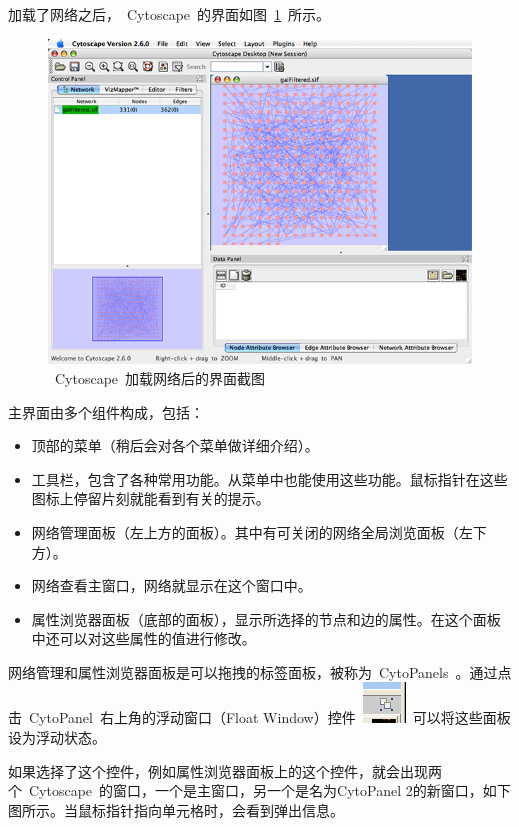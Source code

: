 加载了网络之后，~Cytoscape~的界面如图~\ref{fig:2.1}~所示。

\begin{figure}[!h]
\centering
\includegraphics[width=\textwidth]{images/cytoscape_startup_network_26.png}
\caption{~Cytoscape~加载网络后的界面截图}
\label{fig:2.1}
\end{figure}

主界面由多个组件构成，包括：
\begin{itemize}
\item 顶部的菜单（稍后会对各个菜单做详细介绍）。
\item 工具栏，包含了各种常用功能。从菜单中也能使用这些功能。鼠标指针在这些图标上停留片刻就能看到有关的提示。
\item 网络管理面板（左上方的面板）。其中有可关闭的网络全局浏览面板（左下方）。
\item 网络查看主窗口，网络就显示在这个窗口中。
\item 属性浏览器面板（底部的面板），显示所选择的节点和边的属性。在这个面板中还可以对这些属性的值进行修改。
\end{itemize}

网络管理和属性浏览器面板是可以拖拽的标签面板，被称为~CytoPanels~。通过点击~CytoPanel~右上角的浮动窗口（Float Window）控件~\includegraphics{images/float_icon.png}~可以将这些面板设为浮动状态。

如果选择了这个控件，例如属性浏览器面板上的这个控件，就会出现两个~Cytoscape~的窗口，一个是主窗口，另一个是名为CytoPanel 2的新窗口，如下图所示。当鼠标指针指向单元格时，会看到弹出信息。

